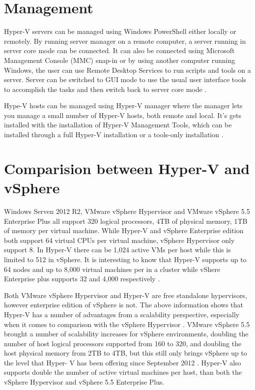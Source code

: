 \documentclass[9pt,twocolumn,twoside]{../../styles/osajnl}
\begin{document}
\section{Management}

Hyper-V servers can be managed using Windows PowerShell either locally
or remotely. By running server manager on a remote computer, a server
running in server core mode can be connected. It can also be connected
using Microsoft Management Console (MMC) snap-in or by using another
computer running Windows, the user can use Remote Desktop Services to
run scripts and tools on a server. Server can be switched to GUI mode
to use the usual user interface tools to accomplish the tasks and then
switch back to server core mode \cite{www-microsoft-technet}. 

Hype-V hosts can be managed using Hyper-V manager where the manager
lets you manage a small number of Hyper-V hosts, both remote and
local. It's gets installed with the installation of Hyper-V Management
Tools, which can be installed through a full Hyper-V installation or a
tools-only installation \cite{www-microsoft-technet}.

\section{Comparision between Hyper-V and vSphere}

Windows Serven 2012 R2, VMware vSphere Hypervisor and VMware vSphere
5.5 Enterprise Plus all support 320 logical processors, 4TB of
physical memory, 1TB of memory per virtual machine. While Hyper-V and
vSphere Enterprise edition both support 64 virtual CPUs per virtual
machine, vSphere Hypervisor only support 8. In Hyper-V there can be
1,024 active VMs per host while this is limited to 512 in vSphere. It
is interesting to know that Hyper-V supports up to 64 nodes and up to
8,000 virtual machines per in a cluster while vShere Enterprise plus
supports 32 and 4,000 respectively \cite{www-hyperv-paper}.

Both VMware vSphere Hypervisor and Hyper-V are free standalone
hypervisors, however enterprise edition of vSphere is not. The above
information shows that Hyper-V has a number of advantages from a
scalability perspective, especially when it comes to comparison with
the vSphere Hypervisor \cite{www-hyperv-paper}. VMware vSphere 5.5
brought a number of scalability increases for vSphere environments,
doubling the number of host logical processors supported from 160 to
320, and doubling the host physical memory from 2TB to 4TB, but this
still only brings vSphere up to the level that Hyper- V has been
offering since September 2012 \cite{www-hyperv-paper}. Hyper-V also
supports double the number of active virtual machines per host, than
both the vSphere Hypervisor and vSphere 5.5 Enterprise Plus.
\end{document}
